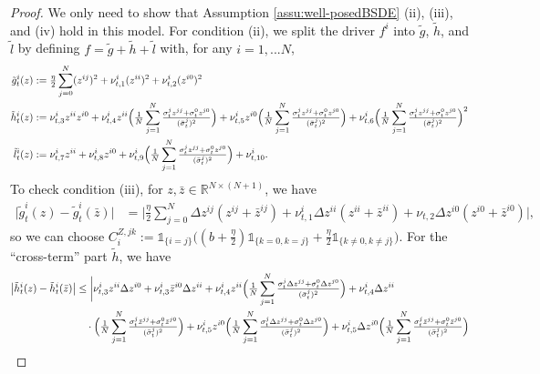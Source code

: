 \documentclass[10pt,a4paper]{article}
\theoremstyle{plain}
\theoremstyle{definition}
\numberwithin{equation}{section}
\begin{document}
\begin{proof}
We only need to show that Assumption \ref{assu:well-posedBSDE} (ii), (iii), and (iv) hold in this model.
For condition (ii), we split the driver $f^i$ into $\tilde{g}$, $\tilde{h}$, and $\tilde{l}$ by defining $f = \tilde{g} + \tilde{h} + \tilde{l}$ with, for any $i=1,...N$,
\begin{align*}
\tilde{g}_{t}^{i}(z) &:= \tfrac{\eta}{2}\sum_{j=0}^{N}(z^{ij})^{2} + \nu_{t,1}^{i}(z^{ii})^{2} + \nu_{t,2}^{i}(z^{i0})^{2} \\
\tilde{h}_{t}^{i}(z) &:= \nu_{t,3}^{i}z^{ii}z^{i0} + \nu_{t,4}^{i}z^{ii}\Bigl(\tfrac{1}{N}\sum_{j=1}^{N}\tfrac{\sigma_{t}^{j}z^{jj}+\sigma_{t}^{0}z^{j0}}{(\bar{\sigma}_{t}^{j})^{2}}\Bigr) + \nu_{t,5}^{i}z^{i0}\Bigl(\tfrac{1}{N}\sum_{j=1}^{N}\tfrac{\sigma_{t}^{j}z^{jj}+\sigma_{t}^{0}z^{j0}}{(\bar{\sigma}_{t}^{j})^{2}}\Bigr) + \nu_{t,6}^{i}\Bigl(\tfrac{1}{N}\sum_{j=1}^{N}\tfrac{\sigma_{t}^{j}z^{jj}+\sigma_{t}^{0}z^{j0}}{(\bar{\sigma}_{t}^{j})^{2}}\Bigr)^{2} \\
\tilde{l}_{t}^{i}(z) &:= \nu_{t,7}^{i}z^{ii} + \nu_{t,8}^{i}z^{i0} + \nu_{t,9}^{i}\Bigl(\tfrac{1}{N}\sum_{j=1}^{N}\tfrac{\sigma_{t}^{j}z^{jj}+\sigma_{t}^{0}z^{j0}}{(\bar{\sigma}_{t}^{j})^{2}}\Bigr) + \nu_{t,10}^{i}.
\end{align*}
To check condition (iii), for $z,\bar{z} \in \mathbb{R}^{N \times (N+1)}$, we have
\begin{align*}
\big|\tilde{g}_{t}^{i}(z)-\tilde{g}_{t}^{i}(\bar{z})\big| &= \bigg| \tfrac{\eta}{2}\sum_{j=0}^{N}\Delta z^{ij}(z^{ij}+\bar{z}^{ij}) + \nu_{t,1}^{i}\Delta z^{ii}(z^{ii} + \bar{z}^{ii}) + \nu_{t,2}\Delta z^{i0}(z^{i0}+\bar{z}^{i0})\bigg|,
\end{align*}
so we can choose
$C_{i}^{Z,jk} := \mathds{1}_{\{i=j\}}\bigl((b+\tfrac{\eta}{2})\mathds{1}_{\{k=0,k=j\}} + \tfrac{\eta}{2}\mathds{1}_{\{k \neq 0,k \neq j\}}\bigr).$
For the ``cross-term'' part $\tilde h$, we have
\begin{align*}
\big|\tilde{h}_{t}^{i}(z)-\tilde{h}_{t}^{i}(\bar{z})\big| &\leq \bigg|\nu_{t,3}^{i}z^{ii}\Delta z^{i0} + \nu_{t,3}^{i}\bar{z}^{i0}\Delta z^{ii} + \nu_{t,4}^{i}z^{ii}\Bigl(\tfrac{1}{N}\sum_{j=1}^{N}\tfrac{\sigma_{t}^{j}\Delta z^{jj}+\sigma_{t}^{0}\Delta z^{j0}}{(\bar{\sigma}_{t}^{j})^{2}}\Bigr) + \nu_{t,4}^{i}\Delta z^{ii} \\
&\ \ \ \cdot\Bigl(\tfrac{1}{N}\sum_{j=1}^{N}\tfrac{\sigma_{t}^{j}\bar{z}^{jj}+\sigma_{t}^{0}\bar{z}^{j0}}{(\bar{\sigma}_{t}^{j})^{2}}\Bigr) + \nu_{t,5}^{i}z^{i0}\Bigl(\tfrac{1}{N}\sum_{j=1}^{N}\tfrac{\sigma_{t}^{j}\Delta z^{jj}+\sigma_{t}^{0}\Delta z^{j0}}{(\bar{\sigma}_{t}^{j})^{2}}\Bigr) + \nu_{t,5}^{i}\Delta z^{i0}\Bigl(\tfrac{1}{N}\sum_{j=1}^{N}\tfrac{\sigma_{t}^{j}\bar{z}^{jj}+\sigma_{t}^{0}\bar{z}^{j0}}{(\bar{\sigma}_{t}^{j})^{2}}\Bigr) \\

\end{align*}
\end{proof}
\end{document}
